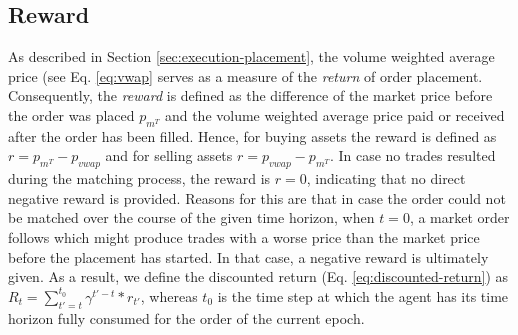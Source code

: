 \subsection{Reward}
\label{setup:reward}
As described in Section \ref{sec:execution-placement}, the volume weighted average price (see Eq. \ref{eq:vwap} serves as a measure of the \textit{return} of order placement.
Consequently, the \textit{reward} is defined as the difference of the market price before the order was placed $p_{m^T}$ and the volume weighted average price paid or received after the order has been filled. 
Hence, for buying assets the reward is defined as $r=p_{m^T}-p_{vwap}$ and for selling assets $r=p_{vwap}-p_{m^T}$.
In case no trades resulted during the matching process, the reward is $r=0$, indicating that no direct negative reward is provided.
Reasons for this are that in case the order could not be matched over the course of the given time horizon, when $t=0$, a market order follows which might produce trades with a worse price than the market price before the placement has started.
In that case, a negative reward is ultimately given.
As a result, we define the discounted return (Eq. \ref{eq:discounted-return}) as $R_t=\sum_{t'=t}^{t_0}{\gamma^{t'-t}*r_{t'}}$, whereas $t_0$ is the time step at which the agent has its time horizon fully consumed for the order of the current epoch.

